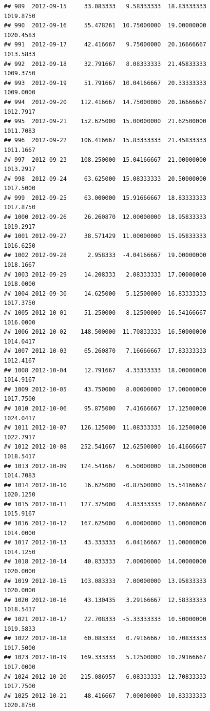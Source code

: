 \documentclass[
]{article}
\begin{document}
\begin{verbatim}
## 989  2012-09-15     33.083333   9.58333333  18.83333333    1019.8750
## 990  2012-09-16     55.478261  10.75000000  19.00000000    1020.4583
## 991  2012-09-17     42.416667   9.75000000  20.16666667    1013.5833
## 992  2012-09-18     32.791667   8.08333333  21.45833333    1009.3750
## 993  2012-09-19     51.791667  10.04166667  20.33333333    1009.0000
## 994  2012-09-20    112.416667  14.75000000  20.16666667    1012.7917
## 995  2012-09-21    152.625000  15.00000000  21.62500000    1011.7083
## 996  2012-09-22    106.416667  15.83333333  21.45833333    1011.1667
## 997  2012-09-23    108.250000  15.04166667  21.00000000    1013.2917
## 998  2012-09-24     63.625000  15.08333333  20.50000000    1017.5000
## 999  2012-09-25     63.000000  15.91666667  18.83333333    1017.8750
## 1000 2012-09-26     26.260870  12.00000000  18.95833333    1019.2917
## 1001 2012-09-27     38.571429  11.00000000  15.95833333    1016.6250
## 1002 2012-09-28      2.958333  -4.04166667  19.00000000    1018.1667
## 1003 2012-09-29     14.208333   2.08333333  17.00000000    1018.0000
## 1004 2012-09-30     14.625000   5.12500000  16.83333333    1017.3750
## 1005 2012-10-01     51.250000   8.12500000  16.54166667    1016.0000
## 1006 2012-10-02    148.500000  11.70833333  16.50000000    1014.0417
## 1007 2012-10-03     65.260870   7.16666667  17.83333333    1012.4167
## 1008 2012-10-04     12.791667   4.33333333  18.00000000    1014.9167
## 1009 2012-10-05     43.750000   8.00000000  17.00000000    1017.7500
## 1010 2012-10-06     95.875000   7.41666667  17.12500000    1024.0417
## 1011 2012-10-07    126.125000  11.08333333  16.12500000    1022.7917
## 1012 2012-10-08    252.541667  12.62500000  16.41666667    1018.5417
## 1013 2012-10-09    124.541667   6.50000000  18.25000000    1014.7083
## 1014 2012-10-10     16.625000  -0.87500000  15.54166667    1020.1250
## 1015 2012-10-11    127.375000   4.83333333  12.66666667    1015.9167
## 1016 2012-10-12    167.625000   6.00000000  11.00000000    1014.0000
## 1017 2012-10-13     43.333333   6.04166667  11.00000000    1014.1250
## 1018 2012-10-14     40.833333   7.00000000  14.00000000    1020.0000
## 1019 2012-10-15    103.083333   7.00000000  13.95833333    1020.0000
## 1020 2012-10-16     43.130435   3.29166667  12.58333333    1018.5417
## 1021 2012-10-17     22.708333  -5.33333333  10.50000000    1019.5833
## 1022 2012-10-18     60.083333   0.79166667  10.70833333    1017.5000
## 1023 2012-10-19    169.333333   5.12500000  10.29166667    1017.0000
## 1024 2012-10-20    215.086957   6.08333333  12.70833333    1017.7500
## 1025 2012-10-21     48.416667   7.00000000  10.83333333    1020.8750

\end{verbatim}
\end{document}
